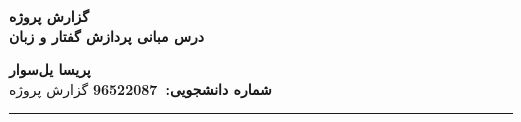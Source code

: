
\def \Subject {گزارش پروژه}
\def \Course {درس مبانی پردازش گفتار و زبان}
\def \Author {پریسا یل‌سوار}
\def \Report {گزارش پروژه}
\def \StudentNumber {96522087}

\begin{center}
\vspace{.4cm}
{\bf {\huge \Subject}}\\
{\bf \Large \Course}
\vspace{.2cm}
\end{center}
{\bf \Author }  \\
{\bf شماره دانشجویی:\ \StudentNumber}
\hspace{\fill} 
{\Large \Report} \\
\hrule
\vspace{0.8cm}

\clearpage


\tableofcontents
\newpage
\listoffigures
\newpage
\listoftables
\newpage

	
	\newpage
	
	\newpage
	
	\newpage
	
	\newpage
	
	\newpage
	








